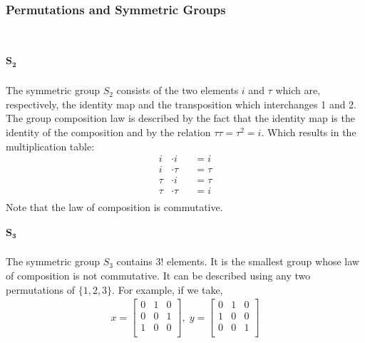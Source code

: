 \documentclass[MathsNotesBase.tex]{subfiles}
\begin{document}
{			\subsubsection{Permutations and Symmetric Groups}\bigskip
		\\
		\subparagraph{$\bm{S_2}$}
		The symmetric group $S_2$ consists of the two elements $i$ and $\tau$ which are, respectively, the identity map and the transposition which interchanges 1 and 2. The group composition law is described by the fact that the identity map is the identity of the composition and by the relation $\tau\tau = \tau^2 = i$. Which results in the multiplication table:	
		\[
		\begin{aligned}
			i &\cdot i &&= i \\
			i &\cdot \tau &&= \tau \\		
			\tau &\cdot i &&= \tau \\
			\tau &\cdot \tau &&= i \\
		\end{aligned}
		\]
		Note that the law of composition is commutative.
		\subparagraph{$\bm{S_3}$}
		The symmetric group $S_3$ contains $3!$ elements. It is the smallest group whose law of composition is not commutative. It can be described using any two permutations of $\{1, 2, 3\}$. For example, if we take,
		\begin{align*}
			x =
			\begin{bmatrix}
			0 & 1 & 0 \\
			0 & 0 & 1 \\
			1 & 0 & 0 \\
			\end{bmatrix},\;
			y =
			\begin{bmatrix}
			0 & 1 & 0 \\
			1 & 0 & 0 \\
			0 & 0 & 1 \\
			\end{bmatrix}
		\end{align*}
}
\end{document}
